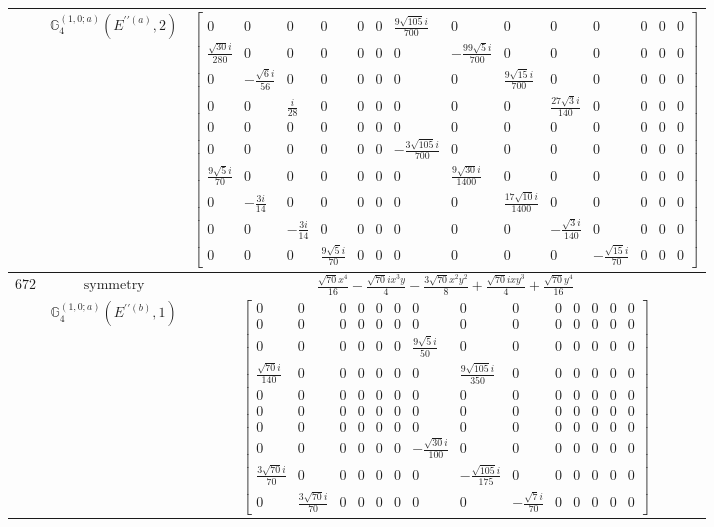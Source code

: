 \documentclass[fleqn,8pt,landscape]{jsarticle}
\begin{document}
\begin{longtable}{ccc}
$  $ & $ \mathbb{G}_{4}^{(1,0;a)}(E^{\prime\prime(a)},2) $ & $ \begin{bmatrix} 0 & 0 & 0 & 0 & 0 & 0 & \frac{9 \sqrt{105} i}{700} & 0 & 0 & 0 & 0 & 0 & 0 & 0 \\ \frac{\sqrt{30} i}{280} & 0 & 0 & 0 & 0 & 0 & 0 & - \frac{99 \sqrt{5} i}{700} & 0 & 0 & 0 & 0 & 0 & 0 \\ 0 & - \frac{\sqrt{6} i}{56} & 0 & 0 & 0 & 0 & 0 & 0 & \frac{9 \sqrt{15} i}{700} & 0 & 0 & 0 & 0 & 0 \\ 0 & 0 & \frac{i}{28} & 0 & 0 & 0 & 0 & 0 & 0 & \frac{27 \sqrt{3} i}{140} & 0 & 0 & 0 & 0 \\ 0 & 0 & 0 & 0 & 0 & 0 & 0 & 0 & 0 & 0 & 0 & 0 & 0 & 0 \\ 0 & 0 & 0 & 0 & 0 & 0 & - \frac{3 \sqrt{105} i}{700} & 0 & 0 & 0 & 0 & 0 & 0 & 0 \\ \frac{9 \sqrt{5} i}{70} & 0 & 0 & 0 & 0 & 0 & 0 & \frac{9 \sqrt{30} i}{1400} & 0 & 0 & 0 & 0 & 0 & 0 \\ 0 & - \frac{3 i}{14} & 0 & 0 & 0 & 0 & 0 & 0 & \frac{17 \sqrt{10} i}{1400} & 0 & 0 & 0 & 0 & 0 \\ 0 & 0 & - \frac{3 i}{14} & 0 & 0 & 0 & 0 & 0 & 0 & - \frac{\sqrt{3} i}{140} & 0 & 0 & 0 & 0 \\ 0 & 0 & 0 & \frac{9 \sqrt{5} i}{70} & 0 & 0 & 0 & 0 & 0 & 0 & - \frac{\sqrt{15} i}{70} & 0 & 0 & 0 \end{bmatrix} $ \\ \hline
$ 672 $ & $ \text{symmetry} $ & $ \frac{\sqrt{70} x^{4}}{16} - \frac{\sqrt{70} i x^{3} y}{4} - \frac{3 \sqrt{70} x^{2} y^{2}}{8} + \frac{\sqrt{70} i x y^{3}}{4} + \frac{\sqrt{70} y^{4}}{16} $ \\
$  $ & $ \mathbb{G}_{4}^{(1,0;a)}(E^{\prime\prime(b)},1) $ & $ \begin{bmatrix} 0 & 0 & 0 & 0 & 0 & 0 & 0 & 0 & 0 & 0 & 0 & 0 & 0 & 0 \\ 0 & 0 & 0 & 0 & 0 & 0 & 0 & 0 & 0 & 0 & 0 & 0 & 0 & 0 \\ 0 & 0 & 0 & 0 & 0 & 0 & \frac{9 \sqrt{5} i}{50} & 0 & 0 & 0 & 0 & 0 & 0 & 0 \\ \frac{\sqrt{70} i}{140} & 0 & 0 & 0 & 0 & 0 & 0 & \frac{9 \sqrt{105} i}{350} & 0 & 0 & 0 & 0 & 0 & 0 \\ 0 & 0 & 0 & 0 & 0 & 0 & 0 & 0 & 0 & 0 & 0 & 0 & 0 & 0 \\ 0 & 0 & 0 & 0 & 0 & 0 & 0 & 0 & 0 & 0 & 0 & 0 & 0 & 0 \\ 0 & 0 & 0 & 0 & 0 & 0 & 0 & 0 & 0 & 0 & 0 & 0 & 0 & 0 \\ 0 & 0 & 0 & 0 & 0 & 0 & - \frac{\sqrt{30} i}{100} & 0 & 0 & 0 & 0 & 0 & 0 & 0 \\ \frac{3 \sqrt{70} i}{70} & 0 & 0 & 0 & 0 & 0 & 0 & - \frac{\sqrt{105} i}{175} & 0 & 0 & 0 & 0 & 0 & 0 \\ 0 & \frac{3 \sqrt{70} i}{70} & 0 & 0 & 0 & 0 & 0 & 0 & - \frac{\sqrt{7} i}{70} & 0 & 0 & 0 & 0 & 0 \end{bmatrix} $ \\ \hline

\end{longtable}
\end{document}
